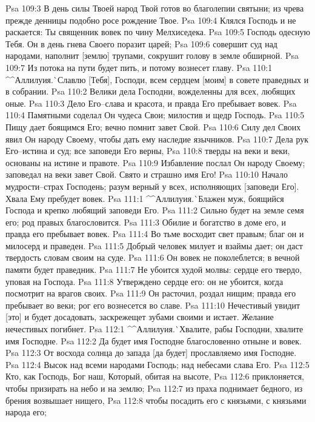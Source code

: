 Psa 109:3  В день силы Твоей народ Твой готов во благолепии святыни; из чрева прежде денницы подобно росе рождение Твое.
Psa 109:4  Клялся Господь и не раскается: Ты священник вовек по чину Мелхиседека.
Psa 109:5  Господь одесную Тебя. Он в день гнева Своего поразит царей;
Psa 109:6  совершит суд над народами, наполнит [землю] трупами, сокрушит голову в земле обширной.
Psa 109:7  Из потока на пути будет пить, и потому вознесет главу.
Psa 110:1  ^^Аллилуия.^^ Славлю [Тебя], Господи, всем сердцем [моим] в совете праведных и в собрании.
Psa 110:2  Велики дела Господни, вожделенны для всех, любящих оные.
Psa 110:3  Дело Его--слава и красота, и правда Его пребывает вовек.
Psa 110:4  Памятными соделал Он чудеса Свои; милостив и щедр Господь.
Psa 110:5  Пищу дает боящимся Его; вечно помнит завет Свой.
Psa 110:6  Силу дел Своих явил Он народу Своему, чтобы дать ему наследие язычников.
Psa 110:7  Дела рук Его--истина и суд; все заповеди Его верны,
Psa 110:8  тверды на веки и веки, основаны на истине и правоте.
Psa 110:9  Избавление послал Он народу Своему; заповедал на веки завет Свой. Свято и страшно имя Его!
Psa 110:10  Начало мудрости--страх Господень; разум верный у всех, исполняющих [заповеди Его]. Хвала Ему пребудет вовек.
Psa 111:1  ^^Аллилуия.^^ Блажен муж, боящийся Господа и крепко любящий заповеди Его.
Psa 111:2  Сильно будет на земле семя его; род правых благословится.
Psa 111:3  Обилие и богатство в доме его, и правда его пребывает вовек.
Psa 111:4  Во тьме восходит свет правым; благ он и милосерд и праведен.
Psa 111:5  Добрый человек милует и взаймы дает; он даст твердость словам своим на суде.
Psa 111:6  Он вовек не поколеблется; в вечной памяти будет праведник.
Psa 111:7  Не убоится худой молвы: сердце его твердо, уповая на Господа.
Psa 111:8  Утверждено сердце его: он не убоится, когда посмотрит на врагов своих.
Psa 111:9  Он расточил, роздал нищим; правда его пребывает во веки; рог его вознесется во славе.
Psa 111:10  Нечестивый увидит [это] и будет досадовать, заскрежещет зубами своими и истает. Желание нечестивых погибнет.
Psa 112:1  ^^Аллилуия.^^ Хвалите, рабы Господни, хвалите имя Господне.
Psa 112:2  Да будет имя Господне благословенно отныне и вовек.
Psa 112:3  От восхода солнца до запада [да будет] прославляемо имя Господне.
Psa 112:4  Высок над всеми народами Господь; над небесами слава Его.
Psa 112:5  Кто, как Господь, Бог наш, Который, обитая на высоте,
Psa 112:6  приклоняется, чтобы призирать на небо и на землю;
Psa 112:7  из праха поднимает бедного, из брения возвышает нищего,
Psa 112:8  чтобы посадить его с князьями, с князьями народа его;
